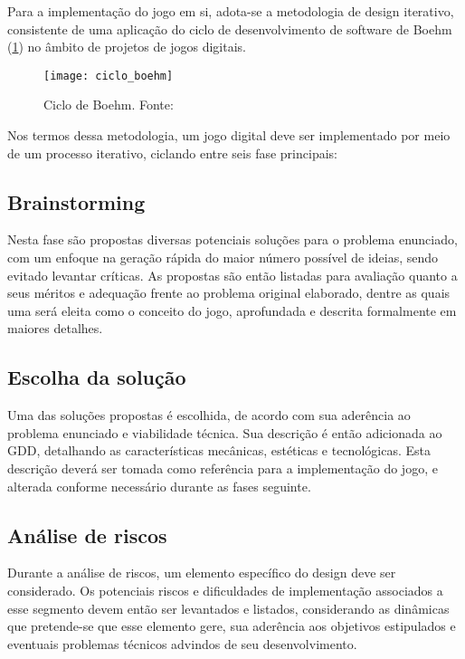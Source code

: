 Para a implementação do jogo em si, adota-se a metodologia de design iterativo, consistente de uma aplicação do ciclo de desenvolvimento de software de Boehm (\ref{fig:ciclo-boehm}) no âmbito de projetos de jogos digitais.

\begin{figure}[h]
	\centering
	\texttt{[image: ciclo\_boehm]}
	\caption{Ciclo de Boehm. Fonte: \cite{schell:2010:art_game_design}}
	\label{fig:ciclo-boehm}
\end{figure}

Nos termos dessa metodologia, um jogo digital deve ser implementado por meio de um processo iterativo, ciclando entre seis fase principais:

\subsection{Brainstorming}\label{subsec-met-brainstorming}

Nesta fase são propostas diversas potenciais soluções para o problema enunciado, com um enfoque na geração rápida do maior número possível de ideias, sendo evitado levantar críticas. As propostas são então listadas para avaliação quanto a seus méritos e adequação frente ao problema original elaborado, dentre as quais uma será eleita como o conceito do jogo, aprofundada e descrita formalmente em maiores detalhes.

\subsection{Escolha da solução}\label{subsec-met-escolha-solucao}

Uma das soluções propostas é escolhida, de acordo com sua aderência ao problema enunciado e viabilidade técnica. Sua descrição é então adicionada ao GDD, detalhando as características mecânicas, estéticas e tecnológicas. Esta descrição deverá ser tomada como referência para a implementação do jogo, e alterada conforme necessário durante as fases seguinte.

\subsection{Análise de riscos}\label{subsec-met-analise-riscos}

Durante a análise de riscos, um elemento específico do design deve ser considerado. Os potenciais riscos e dificuldades de implementação associados a esse segmento devem então ser levantados e listados, considerando as dinâmicas que pretende-se que esse elemento gere, sua aderência aos objetivos estipulados e eventuais problemas técnicos advindos de seu desenvolvimento.

